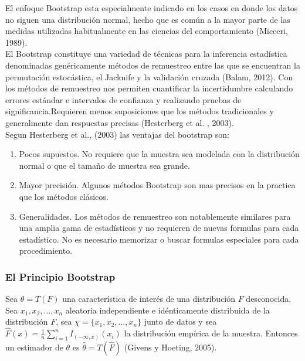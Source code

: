 El enfoque Bootstrap esta especialmente indicado en los casos en donde los datos no siguen una distribución normal, hecho que es común a la mayor parte de las medidas utilizadas habitualmente en las ciencias del comportamiento (Micceri, 1989).\\


El Bootstrap constituye una variedad de técnicas para la inferencia estadística denominadas genéricamente métodos de remuestreo entre las que se encuentran la permutación estocástica, el Jacknife y la validación cruzada (Balam, 2012). Con los métodos de remuestreo nos permiten cuantificar la incertidumbre calculando errores estándar e intervalos de confianza y realizando pruebas de significancia.Requieren menos suposiciones que los métodos tradicionales y generalmente dan respuestas precisas (Hesterberg et al. , 2003).\\


Segun Hesterberg et al., (2003) las ventajas del bootstrap son:

\begin{enumerate}
	\item  Pocos supuestos. No requiere que la muestra sea modelada con la distribución normal o que el tamaño de muestra sea grande.
	
	\item Mayor precisión. Algunos métodos Bootstrap son mas precisos en la practica que los métodos clásicos.
	
	\item Generalidades. Los métodos de remuestreo son notablemente similares para una amplia gama de estadísticos y no requieren de nuevas formulas para cada estadístico. No es necesario memorizar o buscar formulas especiales para cada procedimiento.
\end{enumerate}


\subsubsection{El Principio Bootstrap}
Sea $\theta =T(F)$ una característica de interés de una distribución $F$ desconocida. Sea $x_{1}, x_{2}, \dots, x_{n}$ aleatoria independiente e idénticamente distribuida de la distribución $F$, sea $\chi =\{ x_{1}, x_{2}, \dots, x_{n} \}$ junto de datos y sea $\hat{F}(x) = \frac{1}{n} \sum_{i=1}^{n} I _{(-\infty, x)} (x_{i})$ la distribución empírica de la muestra. Entonces un estimador de $\theta$ es $\hat{\theta} = T(\hat{F})$ (Givens y Hoeting, 2005).\\

